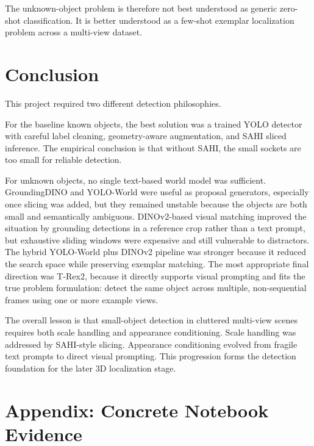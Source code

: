 \documentclass[11pt,a4paper]{article}
\begin{document}
The unknown-object problem is therefore not best understood as generic zero-shot classification. It is better understood as a few-shot exemplar localization problem across a multi-view dataset.

\section{Conclusion}

This project required two different detection philosophies.

For the baseline known objects, the best solution was a trained YOLO detector with careful label cleaning, geometry-aware augmentation, and SAHI sliced inference. The empirical conclusion is that without SAHI, the small sockets are too small for reliable detection.

For unknown objects, no single text-based world model was sufficient. GroundingDINO and YOLO-World were useful as proposal generators, especially once slicing was added, but they remained unstable because the objects are both small and semantically ambiguous. DINOv2-based visual matching improved the situation by grounding detections in a reference crop rather than a text prompt, but exhaustive sliding windows were expensive and still vulnerable to distractors. The hybrid YOLO-World plus DINOv2 pipeline was stronger because it reduced the search space while preserving exemplar matching. The most appropriate final direction was T-Rex2, because it directly supports visual prompting and fits the true problem formulation: detect the same object across multiple, non-sequential frames using one or more example views.

The overall lesson is that small-object detection in cluttered multi-view scenes requires both scale handling and appearance conditioning. Scale handling was addressed by SAHI-style slicing. Appearance conditioning evolved from fragile text prompts to direct visual prompting. This progression forms the detection foundation for the later 3D localization stage.

\section*{Appendix: Concrete Notebook Evidence}
\end{document}
